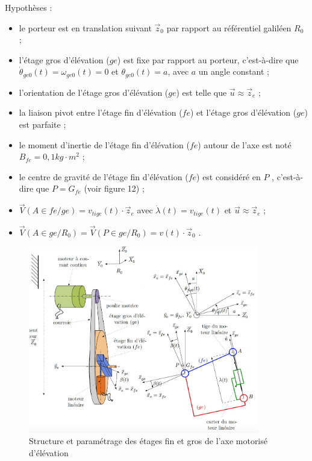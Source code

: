 Hypothèses :
\begin{itemize}
\item le porteur est en translation suivant $\overrightarrow{z}_0$ par rapport au référentiel galiléen $R_0$ ;
\item l'étage gros d'élévation ($ge$) est fixe par rapport au porteur, c'est-à-dire que $\dot{\theta}_{ge0}(t)=\omega_{ge0}(t)=0$ et
$\theta_{ge0}(t) = a$, avec $a$ un angle constant ;
\item l'orientation de l'étage gros d'élévation ($ge$) est telle que $\overrightarrow{u}\approx \overrightarrow{z}_e$ ;
\item la liaison pivot entre l'étage fin d'élévation ($fe$) et l'étage gros d'élévation ($ge$) est parfaite ;
\item le moment d'inertie de l'étage fin d'élévation ($fe$) autour de l'axe  est noté $B_{fe}=0,1kg\cdot m^2$ ;
\item le centre de gravité de l'étage fin d'élévation ($fe$) est considéré en $P$ , c'est-à-dire que $P=G_{fe}$ (voir figure 12) ;
\item $\overrightarrow{V}(A\in fe/ge)=v_{tige}(t)\cdot \overrightarrow{z}_e$ avec $\dot{\lambda}(t)=v_{tige}(t)$ et $\overrightarrow{u}\approx \overrightarrow{z}_e$ ;
\item $\overrightarrow{V}(A\in ge/R_0)=\overrightarrow{V}(P\in ge/R_0)=v(t)\cdot \overrightarrow{z}_0$ .
\end{itemize}


\begin{figure}[!htb]
\begin{center}
\includegraphics[width=0.9\textwidth]{images/figure14.jpg}
\caption{Structure et paramétrage des étages fin et gros de l'axe motorisé d'élévation \label{figure14}}
\end{center}
\end{figure}

